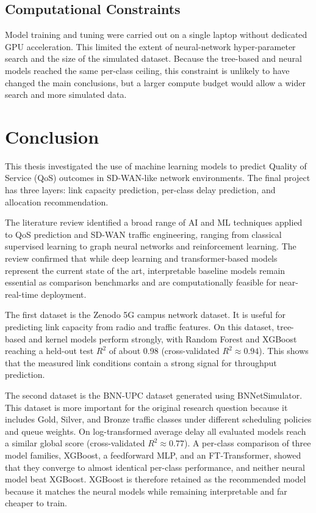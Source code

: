 \documentclass[a4paper,12pt]{Classes/RoboticsLaTeX}
\begin{document}
\section{Computational Constraints}

Model training and tuning were carried out on a single laptop without dedicated GPU acceleration. This limited the extent of neural-network hyper-parameter search and the size of the simulated dataset. Because the tree-based and neural models reached the same per-class ceiling, this constraint is unlikely to have changed the main conclusions, but a larger compute budget would allow a wider search and more simulated data.

\chapter{Conclusion}
\label{chap:conclusion}

This thesis investigated the use of machine learning models to predict Quality of Service (QoS) outcomes in SD-WAN-like network environments. The final project has three layers: link capacity prediction, per-class delay prediction, and allocation recommendation.

The literature review identified a broad range of AI and ML techniques applied to QoS prediction and SD-WAN traffic engineering, ranging from classical supervised learning to graph neural networks and reinforcement learning. The review confirmed that while deep learning and transformer-based models represent the current state of the art, interpretable baseline models remain essential as comparison benchmarks and are computationally feasible for near-real-time deployment.

The first dataset is the Zenodo 5G campus network dataset. It is useful for predicting link capacity from radio and traffic features. On this dataset, tree-based and kernel models perform strongly, with Random Forest and XGBoost reaching a held-out test $R^2$ of about 0.98 (cross-validated $R^2 \approx 0.94$). This shows that the measured link conditions contain a strong signal for throughput prediction.

The second dataset is the BNN-UPC dataset generated using BNNetSimulator. This dataset is more important for the original research question because it includes Gold, Silver, and Bronze traffic classes under different scheduling policies and queue weights. On log-transformed average delay all evaluated models reach a similar global score (cross-validated $R^2 \approx 0.77$). A per-class comparison of three model families, XGBoost, a feedforward MLP, and an FT-Transformer, showed that they converge to almost identical per-class performance, and neither neural model beat XGBoost. XGBoost is therefore retained as the recommended model because it matches the neural models while remaining interpretable and far cheaper to train.
\end{document}
